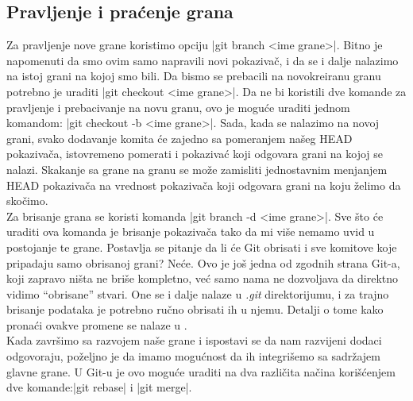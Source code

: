 \documentclass[a4paper]{article}
\begin{document}
{\subsection{Pravljenje i praćenje grana}
\label{subsec:pravljenje_grana}
Za pravljenje nove grane koristimo opciju |git branch <ime grane>|. Bitno je napomenuti da smo ovim samo napravili novi pokazivač, i da se i dalje nalazimo na istoj grani na kojoj smo bili. Da bismo se prebacili na novokreiranu granu potrebno je uraditi |git checkout <ime grane>|. Da ne bi koristili dve komande za pravljenje i prebacivanje na novu granu, ovo je moguće uraditi jednom komandom: |git checkout -b <ime grane>|. 
Sada, kada se nalazimo na novoj grani, svako dodavanje komita će zajedno sa pomeranjem našeg HEAD pokazivača, istovremeno pomerati i pokazivać koji odgovara grani na kojoj se nalazi. Skakanje sa grane na granu se može zamisliti jednostavnim menjanjem HEAD pokazivača na vrednost pokazivača koji odgovara grani na koju želimo da skočimo.\\
Za brisanje grana se koristi komanda |git branch -d <ime grane>|. Sve što će uraditi ova komanda je brisanje pokazivača tako da mi više nemamo uvid u postojanje te grane. Postavlja se pitanje da li će Git obrisati i sve komitove koje pripadaju samo obrisanoj grani? Neće. Ovo je još jedna od zgodnih strana Git-a, koji zapravo ništa ne briše kompletno, već samo nama ne dozvoljava da direktno vidimo ``obrisane'' stvari. One se i dalje nalaze u \textit{.git} direktorijumu, i za trajno brisanje podataka je potrebno ručno obrisati ih u njemu. Detalji o tome kako pronaći ovakve promene se nalaze u \cite{progit}.\\
Kada završimo sa razvojem naše grane i ispostavi se da nam razvijeni dodaci odgovoraju, poželjno je da imamo mogućnost da ih integrišemo sa sadržajem glavne grane. U Git-u je ovo moguće uraditi na dva različita načina korišćenjem dve komande:|git rebase| i |git merge|.  

}
\end{document}
